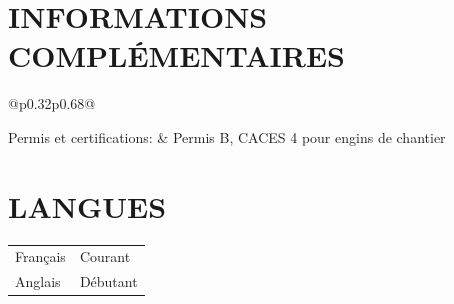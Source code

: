 \documentclass[a4paper]{article}
\makeatletter
\newlength{\tablewidth}
\newenvironment{skills}{%
	\setlength{\tablewidth}{\linewidth}
	\addtolength{\tablewidth}{-2\tabcolsep}
	\begin{tabular}{@{}p{0.32\tablewidth}p{0.68\tablewidth}@{}}
	}{%
	\end{tabular}
}
\makeatother
\begin{document}
	\section{INFORMATIONS COMPLÉMENTAIRES}
	
	\begin{skills}
		Permis et certifications: &
		Permis B, CACES 4 pour engins de chantier
	\end{skills}
	
	\section{LANGUES}
	
	\begin{skills}
		Français & Courant\\
		Anglais & Débutant \\
	\end{skills}
	
\end{document}
